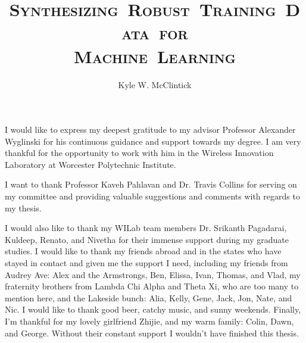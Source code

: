\documentclass[11pt]{mvlthesis}
\title{\scshape \mbox{Synthesizing Robust Training Data for}\\
\scshape \mbox{Machine Learning}}
\author{Kyle W. McClintick}
\begin{document}
\maketitle
\begin{abstract}



\end{abstract}

\begin{frontmatter}
\begin{acknowledgements}
\begin{center}
\vspace{0.4in}
I would like to express my deepest gratitude to my advisor Professor Alexander Wyglinski for his continuous guidance and support towards my degree. I am very thankful for the opportunity to work with him in the Wireless Innovation Laboratory at Worcester Polytechnic Institute. 

I want to thank Professor Kaveh Pahlavan and Dr. Travis Collins for serving on my committee and providing valuable suggestions and comments with regards to my thesis. 

I would also like to thank my WILab team members Dr. Srikanth Pagadarai, Kuldeep, Renato, and Nivetha for their immense support during my graduate studies. I would like to thank my friends abroad and in the states who have stayed in contact and given me the support I need, including my friends from Audrey Ave: Alex and the Armstrongs, Ben, Elissa, Ivan, Thomas, and Vlad, my fraternity brothers from Lambda Chi Alpha and Theta Xi, who are too many to mention here, and the Lakeside bunch: Alia, Kelly, Gene, Jack, Jon, Nate, and Nic. I would like to thank good beer, catchy music, and sunny weekends. Finally, I'm thankful for my lovely girlfriend Zhijie, and my warm family: Colin, Dawn, and George. Without their constant support I wouldn't have finished this thesis.

\end{center}
\end{acknowledgements}

\tableofcontents
\listoffigures
\listoftables

\end{frontmatter}

\end{document}
